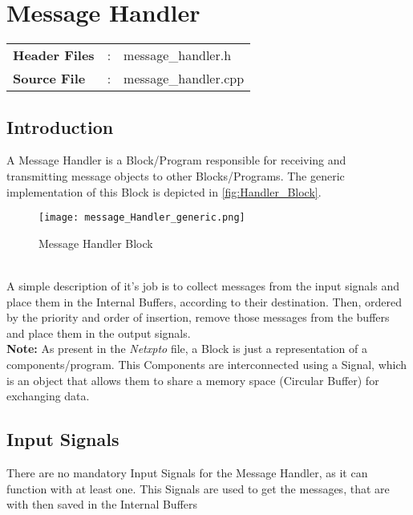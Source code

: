 \clearpage
\graphicspath{{./lib/message_handler/figures/}}
\acresetall

\section{Message Handler}
\label{lib:messagehandler}

\begin{refsection}
\begin{tcolorbox}	
	\begin{tabular}{p{2.75cm} p{0.2cm} p{10.5cm}} 	
    	\textbf{Header Files}    &:& message\_handler.h \\
		\textbf{Source File}     &:& message\_handler.cpp \\
	\end{tabular}
\end{tcolorbox}

\subsection{Introduction}
A Message Handler is a Block/Program responsible for receiving and 
transmitting message objects to other Blocks/Programs.
The generic implementation of this Block is depicted in 
\autoref{fig:Handler_Block}. 
\\
\begin{figure}[!b]
	\centering
	\texttt{[image: message\_Handler\_generic.png]}
	\caption{Message Handler Block}
	\label{fig:Handler_Block}
\end{figure}
\\
A simple description of it's job is to collect messages from the input 
signals and place them in the Internal Buffers, according to their 
destination. Then, ordered by the priority and order of insertion, remove
those messages from the buffers and place them in the output signals.
\\
\textbf{Note:} As present in the \textit{Netxpto} file, a Block is just a
representation of a components/program. This Components are interconnected 
using a Signal, which is an object that allows them to share a memory space
(Circular Buffer) for exchanging data.

\subsection{Input Signals}
There are no mandatory Input Signals for the Message Handler, as it can 
function with at least one. This Signals are used to get the messages, that are with
then saved in the Internal Buffers


\end{refsection}
